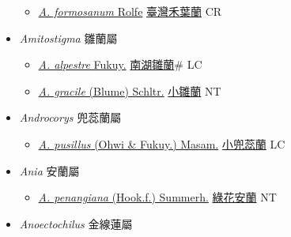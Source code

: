 \begin{itemize}
  \begin{itemize}
        \item[] \href{http://www.theplantlist.org/tpl1.1/search?q=Agrostophyllum+formosanum}{\textit{A. formosanum} Rolfe}     \href{\detokenize{http://taibnet.sinica.edu.tw/chi/taibnet_species_list.php?T2=臺灣禾葉蘭&T2_new_value=true&fr=y}}{臺灣禾葉蘭} CR
  \end{itemize}
 \item[] \textit{Amitostigma} 雛蘭屬
                    
  \begin{itemize}
        \item[] \href{http://www.theplantlist.org/tpl1.1/search?q=Amitostigma+alpestre}{\textit{A. alpestre} Fukuy.}   \href{\detokenize{http://taibnet.sinica.edu.tw/chi/taibnet_species_list.php?T2=南湖雛蘭&T2_new_value=true&fr=y}}{南湖雛蘭}\# LC
        \item[] \href{http://www.theplantlist.org/tpl1.1/search?q=Amitostigma+gracile}{\textit{A. gracile} (Blume) Schltr.}   \href{\detokenize{http://taibnet.sinica.edu.tw/chi/taibnet_species_list.php?T2=小雛蘭&T2_new_value=true&fr=y}}{小雛蘭} NT
  \end{itemize}
 \item[] \textit{Androcorys} 兜蕊蘭屬
                    
  \begin{itemize}
        \item[] \href{http://www.theplantlist.org/tpl1.1/search?q=Androcorys+pusillus}{\textit{A. pusillus} (Ohwi \& Fukuy.) Masam.}   \href{\detokenize{http://taibnet.sinica.edu.tw/chi/taibnet_species_list.php?T2=小兜蕊蘭&T2_new_value=true&fr=y}}{小兜蕊蘭} LC
  \end{itemize}
 \item[] \textit{Ania} 安蘭屬
                    
  \begin{itemize}
        \item[] \href{http://www.theplantlist.org/tpl1.1/search?q=Ania+penangiana}{\textit{A. penangiana} (Hook.f.) Summerh.}   \href{\detokenize{http://taibnet.sinica.edu.tw/chi/taibnet_species_list.php?T2=綠花安蘭&T2_new_value=true&fr=y}}{綠花安蘭} NT
  \end{itemize}
 \item[] \textit{Anoectochilus} 金線蓮屬
                    

\end{itemize}
